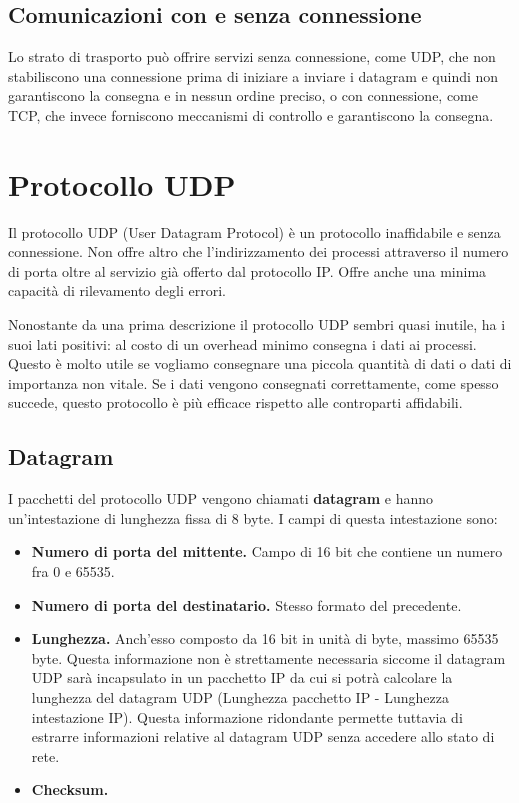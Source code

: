     \subsection{Comunicazioni con e senza connessione}
        Lo strato di trasporto può offrire servizi senza connessione, come UDP, che non stabiliscono una connessione prima di iniziare a inviare i datagram e quindi non garantiscono la consegna e in nessun ordine preciso, o con connessione, come TCP, che invece forniscono meccanismi di controllo e garantiscono la consegna.
        
\section{Protocollo UDP}
    Il protocollo UDP (User Datagram Protocol) è un protocollo inaffidabile e senza connessione. Non offre altro che l'indirizzamento dei processi attraverso il numero di porta oltre al servizio già offerto dal protocollo IP. Offre anche una minima capacità di rilevamento degli errori.
    
    Nonostante da una prima descrizione il protocollo UDP sembri quasi inutile, ha i suoi lati positivi: al costo di un overhead minimo consegna i dati ai processi. Questo è molto utile se vogliamo consegnare una piccola quantità di dati o dati di importanza non vitale. Se i dati vengono consegnati correttamente, come spesso succede, questo protocollo è più efficace rispetto alle controparti affidabili.
    
    \subsection{Datagram}
        I pacchetti del protocollo UDP vengono chiamati \textbf{datagram} e hanno un'intestazione di lunghezza fissa di 8 byte. I campi di questa intestazione sono:
        \begin{itemize}
            \item \textbf{Numero di porta del mittente.} Campo di 16 bit che contiene un numero fra 0 e 65535.
            
            \item \textbf{Numero di porta del destinatario.} Stesso formato del precedente.
            
            \item \textbf{Lunghezza.} Anch'esso composto da 16 bit in unità di byte, massimo 65535 byte. Questa informazione non è strettamente necessaria siccome il datagram UDP sarà incapsulato in un pacchetto IP da cui si potrà calcolare la lunghezza del datagram UDP (Lunghezza pacchetto IP - Lunghezza intestazione IP). Questa informazione ridondante permette tuttavia di estrarre informazioni relative al datagram UDP senza accedere allo stato di rete.
            
            \item \textbf{Checksum.}
        \end{itemize}
        
